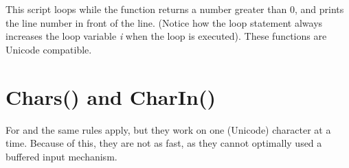 This script loops while the function  returns a number greater than 0, and prints the line number in front of the line. (Notice how the loop statement always increases the loop variable \emph{i} when the loop is executed). These functions are Unicode compatible.

\section{Chars() and CharIn()}
For  and  the same rules apply, but they work on one (Unicode) character at a time. Because of this, they are not as fast, as they cannot optimally used a buffered input mechanism.

  




